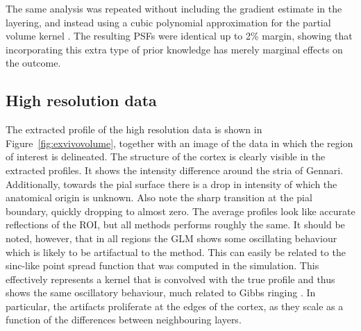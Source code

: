 The same analysis was repeated without including the gradient estimate in the layering, and instead using a cubic polynomial approximation for the partial volume kernel \cite{Koopmans2011}. The resulting PSFs were identical up to 2\% margin, showing that incorporating this extra type of prior knowledge has merely marginal effects on the outcome.

\subsection{High resolution data}
The extracted profile of the high resolution data is shown in Figure~\ref{fig:exvivovolume}, together with an image of the data in which the region of interest is delineated. The structure of the cortex is clearly visible in the extracted profiles. It shows the intensity difference around the stria of Gennari. Additionally, towards the pial surface there is a drop in intensity of which the anatomical origin is unknown. Also note the sharp transition at the pial boundary, quickly dropping to almost zero. The average profiles look like accurate reflections of the ROI, but all methods performs roughly the same. It should be noted, however, that in all regions the GLM shows some oscillating behaviour which is likely to be artifactual to the method. This can easily be related to the sinc-like point spread function that was computed in the simulation. This effectively represents a kernel that is convolved with the true profile and thus shows the same oscillatory behaviour, much related to Gibbs ringing \cite{Gibbs1898}. In particular, the artifacts proliferate at the edges of the cortex, as they scale as a function of the differences between neighbouring layers.


